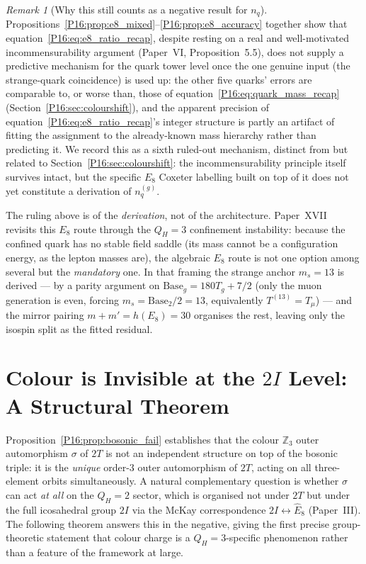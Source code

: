 \documentclass[11pt,a4paper]{article}
\theoremstyle{definition}\newtheorem{definition}[theorem]{Definition}
\theoremstyle{remark}
\newtheorem{remark}[theorem]{Remark}
\theoremstyle{definition}\newtheorem{construction}[theorem]{Construction}
\newcommand{\twoI}{2I}
\newcommand{\twoT}{2T}
\newcommand{\QH}{Q_H}
\begin{document}
\begin{remark}[Why this still counts as a negative result for $n_q$]
\label{P16:rem:e8_negative_result}
Propositions~\ref{P16:prop:e8_mixed}--\ref{P16:prop:e8_accuracy} together show
that equation~\eqref{P16:eq:e8_ratio_recap}, despite resting on a real and
well-motivated incommensurability argument (Paper~VI,
Proposition~5.5), does not supply a predictive mechanism for the
quark tower level once the one genuine input (the strange-quark
coincidence) is used up: the other five quarks' errors are comparable
to, or worse than, those of equation~\eqref{P16:eq:quark_mass_recap}
(Section~\ref{P16:sec:colourshift}), and the apparent precision of
equation~\eqref{P16:eq:e8_ratio_recap}'s integer structure is partly an
artifact of fitting the assignment to the already-known mass hierarchy
rather than predicting it. We record this as a sixth ruled-out
mechanism, distinct from but related to Section~\ref{P16:sec:colourshift}:
the incommensurability principle itself survives intact, but the
specific $E_8$ Coxeter labelling built on top of it does not yet
constitute a derivation of $n_q^{(g)}$.

The ruling above is of the \emph{derivation}, not of the architecture.
Paper~XVII~\cite{Paper17} revisits this $E_8$ route through the $\QH=3$
confinement instability: because the confined quark has no stable field
saddle (its mass cannot be a configuration energy, as the lepton masses
are), the algebraic $E_8$ route is not one option among several but the
\emph{mandatory} one. In that framing the strange anchor $m_s=13$ is
derived --- by a parity argument on $\mathrm{Base}_g=180T_g+7/2$ (only the
muon generation is even, forcing $m_s=\mathrm{Base}_2/2=13$, equivalently
$T^{(13)}=T_\mu$) --- and the mirror pairing $m+m'=h(E_8)=30$ organises the
rest, leaving only the isospin split as the fitted residual.
\end{remark}

\section{Colour is Invisible at the $\twoI$ Level: A Structural Theorem}
\label{P16:sec:colour_exclusion}

Proposition~\ref{P16:prop:bosonic_fail} establishes that the colour
$\mathbb{Z}_3$ outer automorphism $\sigma$ of $\twoT$ is not an
independent structure on top of the bosonic triple: it is the
\emph{unique} order-$3$ outer automorphism of $\twoT$, acting on all
three-element orbits simultaneously. A natural complementary question
is whether $\sigma$ can act \emph{at all} on the $\QH=2$ sector, which
is organised not under $\twoT$ but under the full icosahedral group
$\twoI$ via the McKay correspondence $\twoI\leftrightarrow\widehat{E}_8$
(Paper~III). The following theorem answers this in the negative, giving
the first precise group-theoretic statement that colour charge is a
$\QH=3$-specific phenomenon rather than a feature of the framework at
large.
\end{document}
